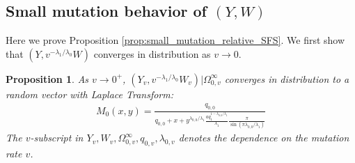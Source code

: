 \documentclass{article}
\numberwithin{equation}{section}
\newtheorem{proposition}{Proposition}
\begin{document}
\subsection{Small mutation behavior of $(Y,W)$}\label{app:small_mutation_relative_SFS}
Here we prove Proposition \ref{prop:small_mutation_relative_SFS}. We first show that $(Y,v^{-\lambda_1/\lambda_0}W)$ converges in distribution as $v\to 0$.
\begin{proposition}
  As $v\to 0^+$, $(Y_v,v^{-\lambda_1/\lambda_0}W_v)|\Omega_{0,v}^\infty$ converges in distribution to a random vector with Laplace Transform:
  \begin{align}
    M_0(x,y)=\frac{q_{0,0}}{q_{0,0}+x+y^{\lambda_{0,0}/\lambda_1}\frac{aq_1^{1-\lambda_{0,0}/\lambda_1}}{\lambda_1}\frac{\pi}{\sin(\pi\lambda_{0,0}/\lambda_1)}}\label{eq:laplace_transform_limit}
  \end{align}
  The $v$-subscript in $Y_v,W_v,\Omega_{0,v}^\infty,q_{0,v},\lambda_{0,v}$ denotes the dependence on the mutation rate $v$.\label{prop:conv_dist}
\end{proposition}
\end{document}
